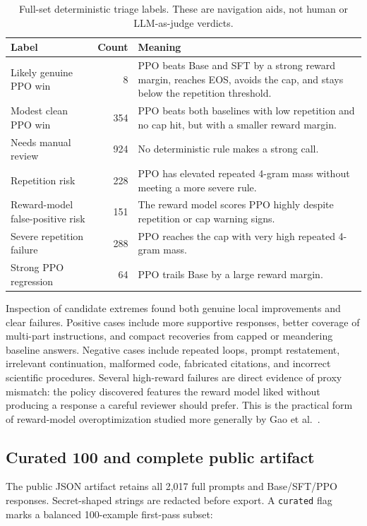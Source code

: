 \documentclass[11pt]{article}
\begin{document}
\begin{table}[H]
\centering
\small
\caption{Full-set deterministic triage labels. These are navigation aids, not
human or LLM-as-judge verdicts.}
\label{tab:triage}
\begin{tabularx}{\textwidth}{@{}Y r Y@{}}
\toprule
\textbf{Label} & \textbf{Count} & \textbf{Meaning}\\
\midrule
Likely genuine PPO win & 8 &
PPO beats Base and SFT by a strong reward margin, reaches EOS, avoids the cap,
and stays below the repetition threshold.\\
Modest clean PPO win & 354 &
PPO beats both baselines with low repetition and no cap hit, but with a
smaller reward margin.\\
Needs manual review & 924 &
No deterministic rule makes a strong call.\\
Repetition risk & 228 &
PPO has elevated repeated 4-gram mass without meeting a more severe rule.\\
Reward-model false-positive risk & 151 &
The reward model scores PPO highly despite repetition or cap warning signs.\\
Severe repetition failure & 288 &
PPO reaches the cap with very high repeated 4-gram mass.\\
Strong PPO regression & 64 &
PPO trails Base by a large reward margin.\\
\bottomrule
\end{tabularx}
\end{table}

Inspection of candidate extremes found both genuine local improvements and
clear failures. Positive cases include more supportive responses, better
coverage of multi-part instructions, and compact recoveries from capped or
meandering baseline answers. Negative cases include repeated loops, prompt
restatement, irrelevant continuation, malformed code, fabricated citations,
and incorrect scientific procedures. Several high-reward failures are direct
evidence of proxy mismatch: the policy discovered features the reward model
liked without producing a response a careful reviewer should prefer. This is
the practical form of reward-model overoptimization studied more generally by
Gao et al.\ \cite{gao2023}.

\subsection{Curated 100 and complete public artifact}

The public JSON artifact retains all 2,017 full prompts and Base/SFT/PPO
responses. Secret-shaped strings are redacted before export. A \texttt{curated}
flag marks a balanced 100-example first-pass subset:
\end{document}
